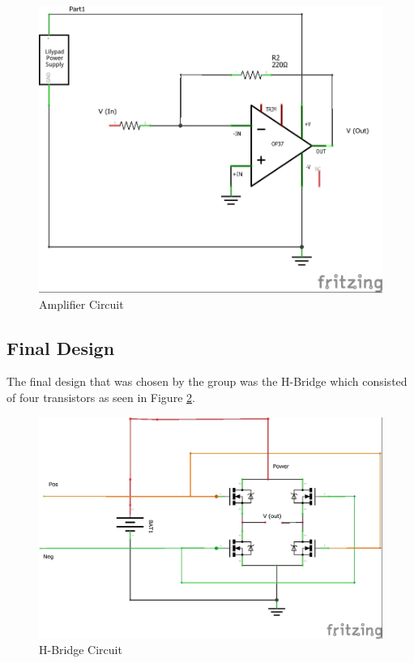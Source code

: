 \documentclass[11.5pt]{article}
\begin{document}
\begin{figure}[H]
    \centering
    \includegraphics[width=0.55\linewidth]{Circuits/Circuit2.jpg}
    \caption{Amplifier Circuit}
    \label{fig:PLC}
\end{figure}
\vspace{0.5}

\subsection{Final Design}
The final design that was chosen by the group was the H-Bridge which consisted of four transistors as seen in Figure \ref{fig:PLC}. 

\begin{figure}[H]
    \centering
    \includegraphics[width=0.55\linewidth]{Circuits/H-Bridge_schem.jpg}
    \caption{H-Bridge Circuit}
    \label{fig:PLC}
\end{figure}
\vspace{0.5}\\
\end{document}
